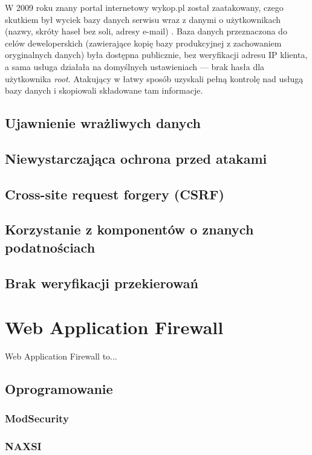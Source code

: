 \documentclass[11pt,a4paper,polish,thesis,oneside]{dcsbook}
\begin{document}
W 2009 roku znany portal internetowy wykop.pl został zaatakowany, czego skutkiem był wyciek bazy danych serwisu wraz z danymi o użytkownikach (nazwy, skróty haseł bez soli, adresy e-mail) \cite{wykop}. Baza danych przeznaczona do celów deweloperskich (zawierające kopię bazy produkcyjnej z zachowaniem oryginalnych danych) była dostępna publicznie, bez weryfikacji adresu IP klienta, a sama usługa działała na domyślnych ustawieniach --- brak hasła dla użytkownika \textit{root}. Atakujący w łatwy sposób uzyskali pełną kontrolę nad usługą bazy danych i skopiowali składowane tam informacje.

\subsection{Ujawnienie wrażliwych danych}



\subsection{Niewystarczająca ochrona przed atakami}
\subsection{Cross-site request forgery (CSRF)}
\subsection{Korzystanie z komponentów o znanych podatnościach}
\subsection{Brak weryfikacji przekierowań}


\section{Web Application Firewall}
Web Application Firewall to...

\subsection{Oprogramowanie}
\subsubsection{ModSecurity}
\subsubsection{NAXSI}
\end{document}
